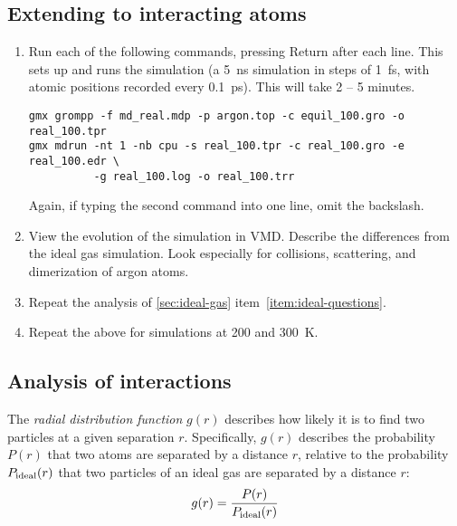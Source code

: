 \documentclass[10pt]{article}
\begin{document}
\subsection{Extending to interacting atoms}
\begin{enumerate}
  \item Run each of the following commands, pressing Return after each line.
    This sets up and runs the simulation (a 5~ns simulation in steps of 1~fs, with atomic positions recorded every 0.1~ps).
    This will take 2 -- 5 minutes.
    
\begin{fullwidth}    
\begin{Verbatim}
gmx grompp -f md_real.mdp -p argon.top -c equil_100.gro -o real_100.tpr
gmx mdrun -nt 1 -nb cpu -s real_100.tpr -c real_100.gro -e real_100.edr \
          -g real_100.log -o real_100.trr
\end{Verbatim}
\end{fullwidth}
    
    Again, if typing the second command into one line, omit the backslash.

  \item View the evolution of the simulation in VMD.
    Describe the differences from the ideal gas simulation.
    Look especially for collisions, scattering, and dimerization of argon atoms.

  \item Repeat the analysis of \autoref{sec:ideal-gas} item~\ref{item:ideal-questions}.

  \item Repeat the above for simulations at 200 and 300~K.

  \end{enumerate}

  \subsection{Analysis of interactions}
  The \emph{radial distribution function} $g(r)$ describes how likely it is to find two particles at a given separation $r$.
  Specifically, $g(r)$ describes the probability $P(r)$ that two atoms are separated by a distance $r$, relative to the probability $P\sb{\textrm{ideal}}(r)$ that two particles of an ideal gas are separated by a distance $r$:
    \[
    g(r) = \frac{P(r)}{P\sb{\textrm{ideal}}(r)}
  \]
\end{document}
